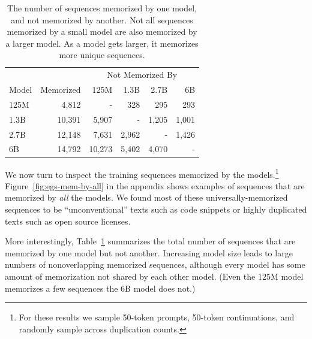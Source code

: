 \begin{table}[t]


    \small
    \begin{tabular}{@{} l r r r r r @{}}
        \toprule
            &&  \multicolumn{4}{c}{Not Memorized By}\\
        \cmidrule{3-6}
         Model & Memorized & 125M & 1.3B & 2.7B & 6B\\
         \midrule
         125M & 4{,}812 &
         - & \cellcolor{blue!2}328 & \cellcolor{blue!1}295 & \cellcolor{blue!1}293\\
         
         1.3B & 10{,}391 &
         \cellcolor{blue!29}5{,}907 & - & \cellcolor{blue!6}1{,}205 & \cellcolor{blue!5}1{,}001\\
         
         2.7B & 12{,}148 &
         \cellcolor{blue!37}7{,}631 & \cellcolor{blue!14}2{,}962 & - & \cellcolor{blue!7}1{,}426\\
         
         6B & 14{,}792 &
         \cellcolor{blue!50}10{,}273 & \cellcolor{blue!26}5{,}402 & \cellcolor{blue!20}4{,}070 & - \\
         \bottomrule
    \end{tabular}
            \centering\caption{The number of sequences memorized by one model, and not memorized by another. Not all sequences memorized by a small model are also memorized by a larger model. As a model gets larger, it memorizes more unique sequences.}\vspace{1em}
    \label{tab:memorized_by_model}
\end{table}

We now turn to inspect the training sequences memorized by the models.\footnote{For these results we sample 50-token prompts, 50-token continuations, and randomly sample across duplication counts.} Figure~\ref{fig:egs-mem-by-all} in the appendix shows examples of sequences that are memorized by \emph{all} the models. We found most of these universally-memorized sequences to be ``unconventional'' texts such as code snippets or highly duplicated texts such as open source licenses. %

More interestingly, Table~\ref{tab:memorized_by_model} summarizes the total number of sequences that are memorized by
one model but not another.
Increasing model size leads to large numbers of nonoverlapping memorized sequences, although every model has some amount of memorization not shared by each other model.
(Even the $125$M model memorizes a few sequences the $6$B model does not.)

